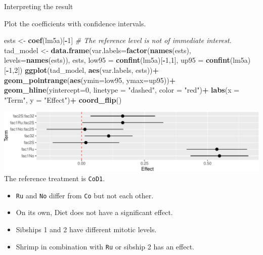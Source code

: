 \documentclass[
  ignorenonframetext,
]{beamer}
\newenvironment{Shaded}{\begin{snugshade}}{\end{snugshade}}
\newcommand{\CommentTok}[1]{\textcolor[rgb]{0.56,0.35,0.01}{\textit{#1}}}
\newcommand{\DataTypeTok}[1]{\textcolor[rgb]{0.13,0.29,0.53}{#1}}
\newcommand{\DecValTok}[1]{\textcolor[rgb]{0.00,0.00,0.81}{#1}}
\newcommand{\KeywordTok}[1]{\textcolor[rgb]{0.13,0.29,0.53}{\textbf{#1}}}
\newcommand{\NormalTok}[1]{#1}
\newcommand{\OperatorTok}[1]{\textcolor[rgb]{0.81,0.36,0.00}{\textbf{#1}}}
\newcommand{\StringTok}[1]{\textcolor[rgb]{0.31,0.60,0.02}{#1}}
\providecommand{\tightlist}{%
  \setlength{\itemsep}{0pt}\setlength{\parskip}{0pt}}
\begin{document}
\begin{frame}[fragile]{Interpreting the result}
\protect\hypertarget{interpreting-the-result}{}

Plot the coefficients with confidence intervals. \tiny

\begin{Shaded}
\begin{Highlighting}[]
\NormalTok{ests <-}\StringTok{ }\KeywordTok{coef}\NormalTok{(lm5a)[}\OperatorTok{-}\DecValTok{1}\NormalTok{] }\CommentTok{# The reference level is not of immediate interest.  }
\NormalTok{tad_model <-}\StringTok{ }\KeywordTok{data.frame}\NormalTok{(}\DataTypeTok{var.labels=}\KeywordTok{factor}\NormalTok{(}\KeywordTok{names}\NormalTok{(ests), }\DataTypeTok{levels=}\KeywordTok{names}\NormalTok{(ests)), ests, }
                        \DataTypeTok{low95 =} \KeywordTok{confint}\NormalTok{(lm5a)[}\OperatorTok{-}\DecValTok{1}\NormalTok{,}\DecValTok{1}\NormalTok{], }\DataTypeTok{up95 =} \KeywordTok{confint}\NormalTok{(lm5a)[}\OperatorTok{-}\DecValTok{1}\NormalTok{,}\DecValTok{2}\NormalTok{])}
\KeywordTok{ggplot}\NormalTok{(tad_model, }\KeywordTok{aes}\NormalTok{(var.labels, ests))}\OperatorTok{+}
\StringTok{  }\KeywordTok{geom_pointrange}\NormalTok{(}\KeywordTok{aes}\NormalTok{(}\DataTypeTok{ymin=}\NormalTok{low95, }\DataTypeTok{ymax=}\NormalTok{up95))}\OperatorTok{+}
\StringTok{  }\KeywordTok{geom_hline}\NormalTok{(}\DataTypeTok{yintercept=}\DecValTok{0}\NormalTok{, }\DataTypeTok{linetype =} \StringTok{"dashed"}\NormalTok{, }\DataTypeTok{color =} \StringTok{"red"}\NormalTok{)}\OperatorTok{+}
\StringTok{  }\KeywordTok{labs}\NormalTok{(}\DataTypeTok{x =} \StringTok{"Term"}\NormalTok{, }\DataTypeTok{y =}  \StringTok{"Effect"}\NormalTok{)}\OperatorTok{+}\StringTok{ }\KeywordTok{coord_flip}\NormalTok{()}
\end{Highlighting}
\end{Shaded}

\includegraphics{Regression_and_ANOVA_files/figure-beamer/unnamed-chunk-15-1.pdf}
\normalsize The reference treatment is \texttt{CoD1}.

\begin{itemize}
\tightlist
\item
  \texttt{Ru} and \texttt{No} differ from \texttt{Co} but not each
  other.
\item
  On its own, Diet does not have a significant effect.
\item
  Sibships 1 and 2 have different mitotic levels.
\item
  Shrimp in combination with \texttt{Ru} or sibship 2 has an effect.
\end{itemize}

\end{frame}
\end{document}
